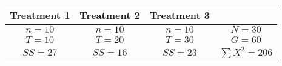 \documentclass[11pt]{article}%
\begin{document}
\begin{enumerate}
\begin{table}[h!]
	\begin{center}
	\begin{tabular}{cccc}
		Treatment 1 & Treatment 2 & Treatment 3 & \\
		\hline
		$n=10$ & $n=10$ & $n=10$ & $N=30$\\
		$T=10$ & $T=20$ & $T=30$ & $G=60$\\
		$SS=27$ & $SS=16$ & $SS=23$ & $\sum X^2=206$\\
		\hline
		
	\end{tabular}
	\end{center}
	
\end{table}


\end{enumerate}
\end{document}
